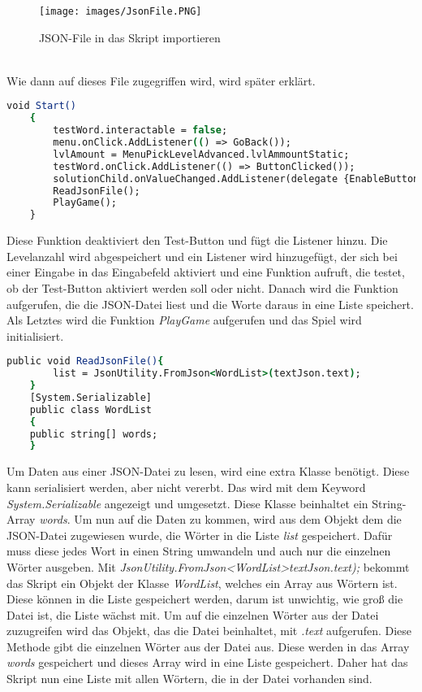 \begin{figure}[htbp]
  \centering
  \texttt{[image: images/JsonFile.PNG]}
  \caption{JSON-File in das Skript importieren}
  \label{jsonUnity}
\end{figure}\\
Wie dann auf dieses File zugegriffen wird, wird später erklärt.\\
\begin{lstlisting}[language=csh, caption={WordMix.cs Start-Funktion}]
	void Start()
	{
		testWord.interactable = false;
		menu.onClick.AddListener(() => GoBack());
		lvlAmount = MenuPickLevelAdvanced.lvlAmmountStatic;
		testWord.onClick.AddListener(() => ButtonClicked());
		solutionChild.onValueChanged.AddListener(delegate {EnableButton(); });
		ReadJsonFile();
		PlayGame();
	}
\end{lstlisting}
Diese Funktion deaktiviert den Test-Button und fügt die Listener hinzu. Die Levelanzahl wird abgespeichert und ein Listener wird hinzugefügt, der sich bei einer Eingabe in das Eingabefeld aktiviert und eine Funktion aufruft, die testet, ob der Test-Button aktiviert werden soll oder nicht. Danach wird die Funktion aufgerufen, die die JSON-Datei liest und die Worte daraus in eine Liste speichert. Als Letztes wird die Funktion \textit{PlayGame} aufgerufen und das Spiel wird initialisiert.\\
\begin{lstlisting}[language=csh, caption={WordMix.cs ReadJsonFile-Funktion}]
	public void ReadJsonFile(){
		list = JsonUtility.FromJson<WordList>(textJson.text);
	}
	[System.Serializable]
	public class WordList
	{
	public string[] words;
	}
\end{lstlisting}
Um Daten aus einer JSON-Datei zu lesen, wird eine extra Klasse benötigt. Diese kann serialisiert werden, aber nicht vererbt. Das wird mit dem Keyword \textit{System.Serializable} angezeigt und umgesetzt. Diese Klasse beinhaltet ein String-Array \textit{words}. Um nun auf die Daten zu kommen, wird aus dem Objekt dem die JSON-Datei zugewiesen wurde, die Wörter in die Liste \textit{list} gespeichert. Dafür muss diese jedes Wort in einen String umwandeln und auch nur die einzelnen Wörter ausgeben. Mit \textit{JsonUtility.FromJson<WordList>textJson.text);} bekommt das Skript ein Objekt der Klasse \textit{WordList}, welches ein Array aus Wörtern ist. Diese können in die Liste gespeichert werden, darum ist unwichtig, wie groß die Datei ist, die Liste wächst mit. Um auf die einzelnen Wörter aus der Datei zuzugreifen wird das Objekt, das die Datei beinhaltet, mit \textit{.text} aufgerufen. Diese Methode gibt die einzelnen Wörter aus der Datei aus. Diese werden in das Array \textit{words} gespeichert und dieses Array wird in eine Liste gespeichert. Daher hat das Skript nun eine Liste mit allen Wörtern, die in der Datei vorhanden sind.\\
